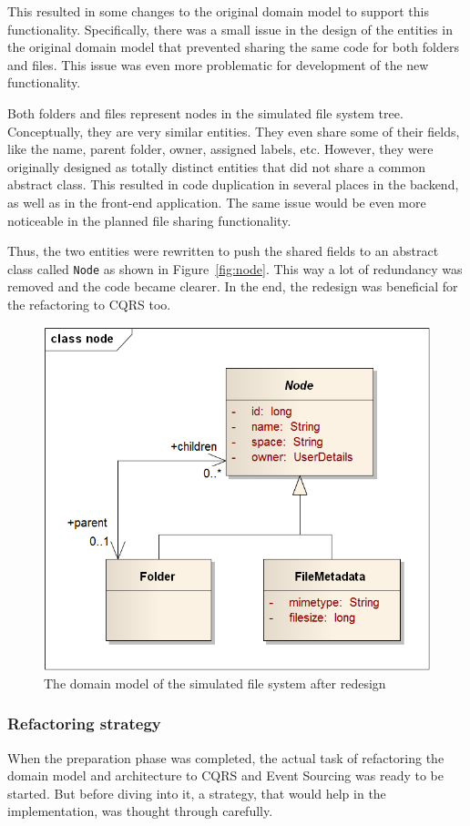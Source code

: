 \documentclass{book}
\begin{document}
This resulted in some changes to the original domain model to support
this functionality. Specifically, there was a small issue in the design
of the entities in the original domain model that prevented sharing the
same code for both folders and files. This issue was even more
problematic for development of the new functionality.

Both folders and files represent nodes in the simulated file system
tree. Conceptually, they are very similar entities. They even share some
of their fields, like the name, parent folder, owner, assigned labels,
etc. However, they were originally designed as totally distinct entities
that did not share a common abstract class. This resulted in code
duplication in several places in the backend, as well as in the
front-end application. The same issue would be even more noticeable in
the planned file sharing functionality.

Thus, the two entities were rewritten to push the shared fields to an
abstract class called \texttt{Node} as shown in Figure~\ref{fig:node}.
This way a lot of redundancy was removed and the code became clearer. In
the end, the redesign was beneficial for the refactoring to CQRS too.


\begin{figure}[h!]
\begin{center}
\includegraphics[width=0.55\columnwidth]{figures/node/node}
\caption{The domain model of the simulated file system after redesign%
}
\end{center}
\end{figure}

\subsubsection{Refactoring strategy}\label{refactoring-strategy}

When the preparation phase was completed, the actual task of refactoring
the domain model and architecture to CQRS and Event Sourcing was ready
to be started. But before diving into it, a strategy, that would help in
the implementation, was thought through carefully.
\end{document}
